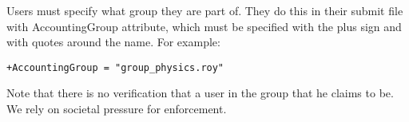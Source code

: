 Users must specify what group they are part of. They do this in their
submit file with AccountingGroup attribute, which must be
specified with the plus sign and with quotes around the name. For
example:
\begin{verbatim}
+AccountingGroup = "group_physics.roy"
\end{verbatim}

Note that there is no verification that a user in the group that he
claims to be. We rely on societal pressure for enforcement. 

